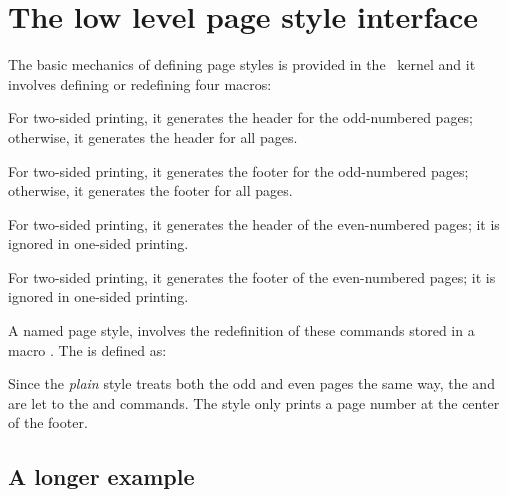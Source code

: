 \section{The low level page style interface}

The basic mechanics of defining page styles is provided in the \LaTeXe\ kernel and it  involves defining or redefining four macros:

\begin{marglist}
\item [\cs{oddhead}] For two-sided printing, it generates the header for the odd-numbered
pages; otherwise, it generates the header for all pages.

\item [\cs{oddfoot}] For two-sided printing, it generates the footer for the odd-numbered pages; otherwise, it generates the footer for all pages.

\item [\cs{evenhead}] For two-sided printing, it generates the header of the even-numbered
pages; it is ignored in one-sided printing.

\item [\cs{evenfoot}] For two-sided printing, it generates the footer of the even-numbered
pages; it is ignored in one-sided printing.

\end{marglist}
A named page style, involves the redefinition of these commands stored in a macro .
The  is defined as:




Since the \textit{plain} style treats both the odd and even pages the same way, the  and  are let to the  and  commands. The style only prints a page number at the center of the footer.


\subsection{A longer example}

